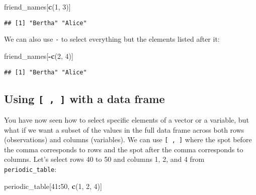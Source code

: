 \documentclass[]{tufte-book}
\newenvironment{Shaded}{\begin{snugshade}}{\end{snugshade}}
\newcommand{\DecValTok}[1]{\textcolor[rgb]{0.00,0.00,0.81}{#1}}
\newcommand{\KeywordTok}[1]{\textcolor[rgb]{0.13,0.29,0.53}{\textbf{#1}}}
\newcommand{\NormalTok}[1]{#1}
\newcommand{\OperatorTok}[1]{\textcolor[rgb]{0.81,0.36,0.00}{\textbf{#1}}}
\begin{document}
\begin{Shaded}
\begin{Highlighting}[]
\NormalTok{friend\_names[}\KeywordTok{c}\NormalTok{(}\DecValTok{1}\NormalTok{, }\DecValTok{3}\NormalTok{)]}
\end{Highlighting}
\end{Shaded}

\begin{verbatim}
## [1] "Bertha" "Alice"
\end{verbatim}

We can also use \texttt{-} to select everything but the elements listed after it:

\begin{Shaded}
\begin{Highlighting}[]
\NormalTok{friend\_names[}\OperatorTok{{-}}\KeywordTok{c}\NormalTok{(}\DecValTok{2}\NormalTok{, }\DecValTok{4}\NormalTok{)]}
\end{Highlighting}
\end{Shaded}

\begin{verbatim}
## [1] "Bertha" "Alice"
\end{verbatim}

\hypertarget{using-with-a-data-frame}{%
\subsection{\texorpdfstring{Using \texttt{{[}\ ,\ {]}} with a data frame}{Using {[} , {]} with a data frame}}\label{using-with-a-data-frame}}

You have now seen how to select specific elements of a vector or a variable, but what if we want a subset of the values in the full data frame across both rows (observations) and columns (variables). We can use \texttt{{[}\ ,\ {]}} where the spot before the comma corresponds to rows and the spot after the comma corresponds to columns. Let's select rows 40 to 50 and columns 1, 2, and 4 from \texttt{periodic\_table}:

\begin{Shaded}
\begin{Highlighting}[]
\NormalTok{periodic\_table[}\DecValTok{41}\OperatorTok{:}\DecValTok{50}\NormalTok{, }\KeywordTok{c}\NormalTok{(}\DecValTok{1}\NormalTok{, }\DecValTok{2}\NormalTok{, }\DecValTok{4}\NormalTok{)]}
\end{Highlighting}
\end{Shaded}
\end{document}
